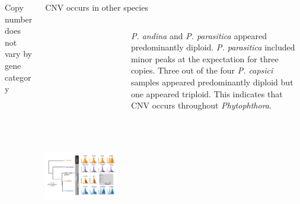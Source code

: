 \begin{columns}[t]
\begin{column}{0.54\textwidth}
\begin{block}{\large Copy number does not vary by gene category}
\begin{columns}
\begin{column}{0.45\textwidth}
        \end{column}
      \end{columns}

    \end{block}
  \end{column}


  \begin{column}{0.40\textwidth}
    \begin{block}{\large CNV occurs in other species}
      \begin{columns}
        \begin{column}{0.40\textwidth}

          \includegraphics[height=13cm]{./figures/Fig7_ploidy.pdf}

        \end{column}
        \begin{column}{0.56\textwidth}
\scriptsize
\vspace{5mm}

\textit{P. andina} and \textit{P. parasitica} appeared predominantly diploid.
\textit{P. parasitica} included minor peaks at the expectation for three copies.
Three out of the four \textit{P. capsici} samples appeared predominantly diploid but one appeared triploid.
This indicates that CNV occurs throughout \textit{Phytophthora}.
        \end{column}
      \end{columns}


\end{block}
\end{column}
\end{columns}
